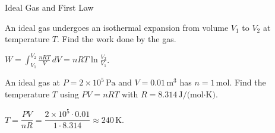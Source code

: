 \begin{KnowledgePoint}{Ideal Gas and First Law \Core}
  \KPProblems
\begin{cheatproblem}
  An ideal gas undergoes an isothermal expansion from volume $V_1$ to $V_2$ at temperature $T$. Find the work done by the gas.
  \begin{solutionbox}
  $W=\int_{V_1}^{V_2} \frac{nRT}{V}\,dV=nRT\ln\!\frac{V_2}{V_1}$.
  \end{solutionbox}
  \end{cheatproblem}
\begin{cheatproblem}
  An ideal gas at $P=2\times10^5\,\text{Pa}$ and $V=0.01\,\text{m}^3$ has $n=1\,\text{mol}$. Find the temperature $T$ using $PV=nRT$ with $R=8.314\,\text{J/(mol·K)}$.
\begin{solutionbox}
  $T=\dfrac{PV}{nR}=\dfrac{2\times10^5\cdot0.01}{1\cdot8.314}\approx240\,\text{K}$.
  \end{solutionbox}
  \end{cheatproblem}
\end{KnowledgePoint}

